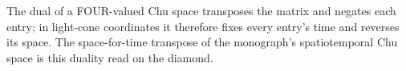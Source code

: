 \begin{theorem}\label{thm:light-cone-chu-dual}\leanok{}
The dual of a FOUR-valued Chu space transposes the matrix and negates each entry;
in light-cone coordinates it therefore fixes every entry's time and reverses its
space. The space-for-time transpose of the monograph's spatiotemporal Chu space is
this duality read on the diamond.
\end{theorem}
